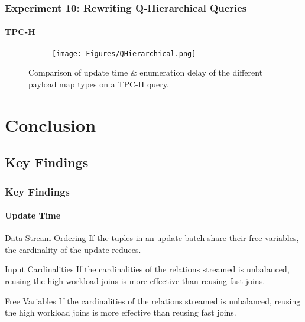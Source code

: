 \documentclass[
	11pt, %
]{beamer}
\begin{document}
\begin{frame}
	\frametitle{Experiment 10: Rewriting Q-Hierarchical Queries}
	\framesubtitle{TPC-H}
	\begin{figure}
		\begin{minipage}{0.25\textwidth}
		\end{minipage}
		\begin{minipage}{0.74\textwidth}
			\begin{figure}
				\centering
				\texttt{[image: Figures/QHierarchical.png]}
			\end{figure}
		\end{minipage}
		\caption{Comparison of update time \& enumeration delay of the different payload map types on a TPC-H query.}
	\end{figure}
\end{frame}

\section{Conclusion}
\subsection{Key Findings}
\begin{frame}
	\frametitle{Key Findings}
	\framesubtitle{Update Time}
	\begin{block}{Data Stream Ordering}
		If the tuples in an update batch share their free variables, the cardinality of the update reduces.
	\end{block}
	\begin{block}{Input Cardinalities}
		If the cardinalities of the relations streamed is unbalanced, reusing the high workload joins is more effective than reusing fast joins.
	\end{block}
	\begin{block}{Free Variables}
		If the cardinalities of the relations streamed is unbalanced, reusing the high workload joins is more effective than reusing fast joins.
	\end{block}
\end{frame}
\end{document}
